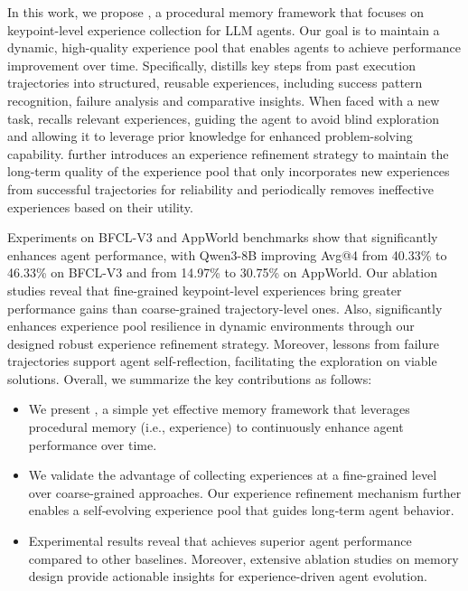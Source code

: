 In this work, we propose {\ours}, a procedural memory framework that focuses on keypoint-level experience collection for LLM agents. 
Our goal is to maintain a dynamic, high-quality experience pool that enables agents to achieve performance improvement over time. 
Specifically, {\ours} distills key steps from past execution trajectories into structured, reusable experiences, including success pattern recognition, failure analysis and comparative insights. 
When faced with a new task, {\ours} recalls relevant experiences, guiding the agent to avoid blind exploration and allowing it to leverage prior knowledge for enhanced problem-solving capability. 
{\ours} further introduces an experience refinement strategy to maintain the long-term quality of the experience pool that only incorporates new experiences from successful trajectories for reliability and periodically removes ineffective experiences based on their utility. 


Experiments on BFCL-V3 and AppWorld benchmarks show that {\ours} significantly enhances agent performance, with Qwen3-8B improving Avg@4 from 40.33\% to 46.33\% on BFCL-V3 and from 14.97\% to 30.75\% on AppWorld. %
Our ablation studies reveal that fine-grained keypoint-level experiences bring greater performance gains than coarse-grained trajectory-level ones. 
Also, {\ours} significantly enhances experience pool resilience in dynamic environments through our designed robust experience refinement strategy. 
Moreover, lessons from failure trajectories support agent self-reflection, facilitating the exploration on viable solutions.
Overall, we summarize the key contributions as follows: 
\begin{itemize}[leftmargin=12pt,topsep=2pt,itemsep=-2pt]
    \item We present {\ours}, a simple yet effective memory framework that leverages procedural memory (i.e., experience) to continuously enhance agent performance over time.
    \item We validate the advantage of collecting experiences at a fine-grained level over coarse-grained approaches. Our experience refinement mechanism further enables a self‑evolving experience pool that guides long‑term agent behavior.
    \item Experimental results reveal that {\ours} achieves superior agent performance compared to other baselines. Moreover, extensive ablation studies on memory design provide actionable insights for experience-driven agent evolution.
\end{itemize}


